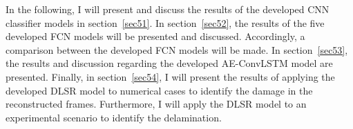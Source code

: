 In the following, I will present and discuss the results of the developed CNN classifier models in section~\ref{sec51}. 
In section~\ref{sec52}, the results of the five developed FCN models will be presented and discussed.
Accordingly, a comparison between the developed FCN models will be made.
In section~\ref{sec53}, the results and discussion regarding the developed AE-ConvLSTM model are presented.
Finally, in section~\ref{sec54}, I will present the results of applying the developed DLSR model to numerical cases to identify the damage in the reconstructed frames.
Furthermore, I will apply the DLSR model to an experimental scenario to identify the delamination.





